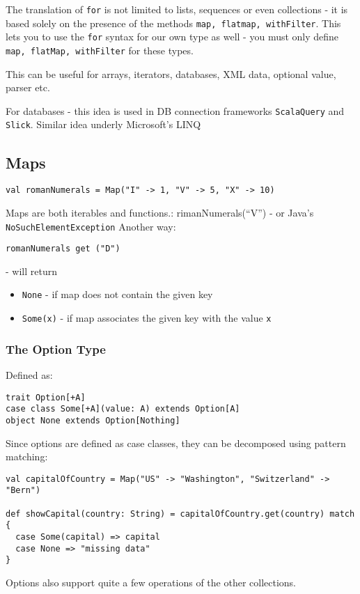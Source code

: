 \documentclass{scrartcl}
\begin{document}
The translation of \lstinline|for| is not limited to lists, sequences or even
collections - it is based solely on the presence of the methods
 \lstinline|map, flatmap, withFilter|. This lets you to use the \lstinline|for|
 syntax for our own type as well - you must only define
 \lstinline|map, flatMap, withFilter| for these types.

This can be useful for arrays, iterators, databases, XML data, optional value,
parser etc.

For databases - this idea is used in DB connection frameworks
\lstinline|ScalaQuery| and \lstinline|Slick|. Similar idea underly Microsoft's LINQ

\subsection{Maps}
\label{sec:Maps}
\begin{lstlisting}
val romanNumerals = Map("I" -> 1, "V" -> 5, "X" -> 10)
\end{lstlisting}
Maps are both iterables and functions.: rimanNumerals(``V'') - or Java's
\lstinline|NoSuchElementException| Another way:
\begin{lstlisting}
romanNumerals get ("D")
\end{lstlisting}
- will return
\begin{itemize}
\item \lstinline|None| - if map does not contain the given key
\item \lstinline|Some(x)| - if map associates the given key with the value
  \lstinline|x|
\end{itemize}

\subsubsection{The Option Type}
\label{sec:OptionType}
Defined as:
\begin{lstlisting}
trait Option[+A]
case class Some[+A](value: A) extends Option[A]
object None extends Option[Nothing]
\end{lstlisting}

Since options are defined as case classes, they can be decomposed using pattern
matching:
\begin{lstlisting}
val capitalOfCountry = Map("US" -> "Washington", "Switzerland" -> "Bern")

def showCapital(country: String) = capitalOfCountry.get(country) match {
  case Some(capital) => capital
  case None => "missing data"
}
\end{lstlisting}
Options also support quite a few operations of the other collections.
\end{document}
